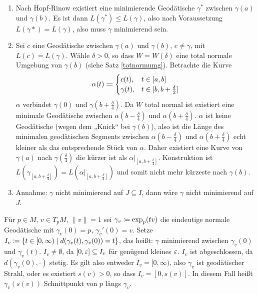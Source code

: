 \documentclass[a4paper,twoside,DIV15,BCOR12mm]{scrbook}
\begin{document}
\begin{beweis}
\begin{enumerate}
\item 
Nach Hopf-Rinow existiert eine minimierende Geodätische $\gamma^*$ zwischen $\gamma(a)$ und $\gamma(b)$. Es ist dann $L(\gamma^*)\le L(\gamma)$, also nach Voraussetzung $L(\gamma*)=L(\gamma)$, also muss $\gamma$ minimierend sein.
\item Sei $c$ eine Geodätische zwischen $\gamma(a)$ und $\gamma(b)$, $c\ne \gamma$, mit $L(c) = L(\gamma)$. Wähle $\delta>0$, so dass $W=W(\delta)$ eine total normale Umgebung von $\gamma(b)$ (siehe Satz \ref{totnormumg}). Betrachte die Kurve
\[
\alpha(t) \da 
\begin{cases}
c(t), & t\in [a,b] \\
\gamma(t), & t\in [b,b+\frac\delta2]
\end{cases}
\]
$\alpha$ verbindet $\gamma(0)$ und $\gamma(b+\frac\delta4)$. Da $W$ total normal ist existiert eine minimale Geodätische zwischen $\alpha(b-\frac\delta4)$ und $\alpha(b+\frac\delta4)$. $\alpha$ ist keine Geodätische (wegen dem „Knick“ bei $\gamma(b)$), also ist die Länge des minimalen geodätischen Segments zwischen $\alpha(b-\frac\delta4)$ und $\alpha(b+\frac\delta4)$ echt kleiner als das entsprechende Stück von $\alpha$. Daher existiert eine Kurve von $\gamma(a)$ nach $\gamma(\frac\delta4)$ die kürzer ist als $\alpha|_{[a,b+\frac\delta4]}$. Konstruktion ist $L(\gamma_{[a,b+\frac\delta4]}) = L(\alpha|_{[a,b+\frac\delta4]})$ und somit nicht mehr kürzeste nach $\gamma(b)$.
\item Annahme: $\gamma$ nicht minimierend auf $J\subseteq I$, dann wäre $\gamma$ nicht minimierend auf $J$.
\end{enumerate}
\end{beweis}

Für $p\in M$, $v\in T_pM$, $\|v\|=1$ sei $\gamma_v \da \exp_p(tv)$ die eindeutige normale Geodätische mit $\gamma_v(0)=p$, $\gamma_v'(0)=v$. Setze $I_v \da \{ t\in [0,\infty) \mid d(\gamma_v(t), \gamma_v(0))=t\}$, das heißt: $\gamma$ minimierend zwischen $\gamma_v(0)$ und $\gamma_v(t)$. $I_v \ne \emptyset$, da $[0,\varepsilon]\subseteq I_v$ für genügend kleines $\varepsilon$. $I_v$ ist abgeschlossen, da $d(\gamma_v(0),\cdot)$ stetig. Es gilt also entweder $I_v = [0,\infty)$, also $\gamma_v$ ist geodätischer Strahl, oder es existiert $s(v)>0$, so dass $I_v=[0,s(v)]$. In diesem Fall heißt $\gamma_v(s(v))$ Schnittpunkt von $p$ längs $\gamma_v$.
\end{document}
